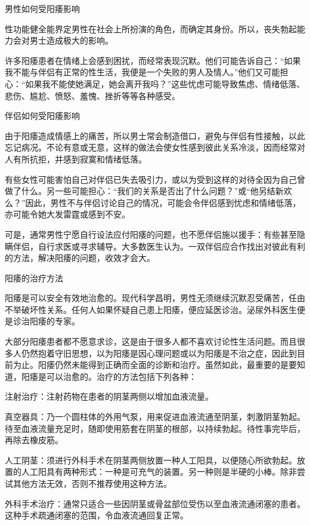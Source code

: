 \documentclass[12pt,UTF8]{ctexbook}
\begin{document}
男性如何受阳痿影响


性功能健全能界定男性在社会上所扮演的角色，而确定其身份。所以，丧失勃起能力会对男士造成极大的影响。

许多阳痿患者在情绪上会感到困扰，而经常表现沉默。他们可能告诉自己：“如果我不能与伴侣有正常的性生活，我便是一个失败的男人及情人。”他们又可能担心：“如果我不能使她满足，她会离开我吗？”这些忧虑可能导致焦虑、情绪低落、悲伤、尴尬、愤怒、羞愧、挫折等等各种感受。





伴侣如何受阳痿影响


由于阳痿造成情感上的痛苦，所以男士常会制造借口，避免与伴侣有性接触，以此忘记病况。不论有意或无意，这样的做法会使女性感到彼此关系冷淡，因而经常对人有所抗拒，并感到寂寞和情绪低落。

有些女性可能害怕自己对伴侣已失去吸引力，或以为受到这样的对待全因为自己曾做了什么。另一些可能担心：“我们的关系是否出了什么问题？”或“他另结新欢么？”因此，男性不与伴侣讨论自己的情况，可能会令伴侣感到忧虑和情绪低落，亦可能令她大发雷霆或感到不安。

可是，通常男性宁愿自行设法应付阳痿的问题，也不愿伴侣施以援手：有些甚至隐瞒伴侣，自行求医或寻求辅导。大多数医生认为。一双伴侣应合作找出对彼此有利的方法，解决阳痿的问题，收效才会大。





阳痿的治疗方法


阳痿是可以安全有效地治愈的。现代科学昌明，男性无须继续沉默忍受痛苦，任由不举破坏性关系。任何人如果怀疑自己患上阳痿，便应延医诊治。泌尿外科医生便是诊治阳痿的专家。

大部分阳痿患者都不愿意求诊，这是由于很多人都不喜欢讨论性生活问题。而且很多人仍然抱着守旧思想，以为阳痿是因心理问题或以为阳痿是不治之症，因此到目前为止。阳痿仍然未能得到正确而全面的诊断和治疗。虽然如此，最重要的是要知道，阳痿是可以治愈的。治疗的方法包括下列各种：

注射治疗：注射药物在患者的阴茎两侧以增加血液流量。

真空器具：乃一个圆柱体的外用气泵，用来促进血液流通至阴茎，刺激阴茎勃起。待至血液流量充足时，随即使用筋套在阴茎的根部，以持续勃起。待性事完毕后，再除去橡皮筋。

人工阴茎：须进行外科手术在阴茎两侧放置一种人工阳具，以便随心所欲勃起。放置的人工阳具有两种形式：一种是可充气的装置。另一种则是半硬的小棒。除非尝试其他方法无效，否则不推荐使用这种方法。

外科手术治疗：通常只适合一些因阴茎或骨盆部位受伤以至血液流通闭塞的患者。这种手术疏通闭塞的范围，令血液流通回复正常。
\end{document}
